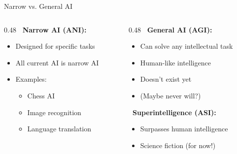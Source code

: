 \documentclass[aspectratio=169, 10pt]{beamer}
\begin{document}
\begin{frame}{Narrow vs. General AI}

    \begin{columns}
        \begin{column}{0.48\textwidth}
            \textbf{\faBullseye\ Narrow AI (ANI):}
            \begin{itemize}
                \item Designed for specific tasks
                \item All current AI is narrow AI
                \item Examples:
                \begin{itemize}
                    \item Chess AI
                    \item Image recognition
                    \item Language translation
                \end{itemize}
            \end{itemize}
        \end{column}

        \begin{column}{0.48\textwidth}
            \textbf{\faGlobe\ General AI (AGI):}
            \begin{itemize}
                \item Can solve any intellectual task
                \item Human-like intelligence
                \item Doesn't exist yet
                \item (Maybe never will?)
            \end{itemize}

            \vspace{3mm}
            \textbf{\faRocket\ Superintelligence (ASI):}
            \begin{itemize}
                \item Surpasses human intelligence
                \item Science fiction (for now!)
            \end{itemize}
        \end{column}
    \end{columns}

    \vspace{3mm}
    \begin{center}
\end{center}
\end{frame}
\end{document}

